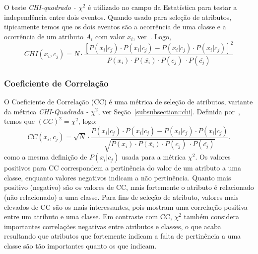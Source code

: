 O teste \textit{CHI-quadrado - $\chi^2$} é utilizado no campo da Estatística para testar a independência entre dois eventos. Quando usado para seleção de atributos, tipicamente temos que os dois eventos são a ocorrência de uma classe e a ocorrência de um atributo $A_i$ com valor $x_i$, ver~\cite{Zheng03}. Logo,
\begin{equation}\label{eqn::chi}
   CHI(x_i, c_j) = N \cdot \frac{ [ P(x_i|c_j) \cdot P(\overline{x_i}|\overline{c_j}) - P(x_i|\overline{c_j}) \cdot P(\overline{x_i}|c_j) ]^2 } {P(x_i) \cdot P(\overline{x_i}) \cdot P(c_j) \ \cdot P(\overline{c_j}) }
\end{equation}

\subsubsection{Coeficiente de Correlação}
\label{subsubsection::cc}

O Coeficiente de Correlação (CC) é uma métrica de seleção de atributos, variante da métrica \textit{CHI-Quadrada - $\chi^2$}, ver Seção~\ref{subsubsection::chi}. Definida por~\cite{Ng97}, temos que $(CC)^2 = \chi^2$, logo:
\begin{equation}\label{eqn::ce}
   CC(x_i, c_j) = \sqrt{N} \cdot \frac{ P(x_i|c_j) \cdot P(\overline{x_i}|\overline{c_j}) - P(x_i|\overline{c_j}) \cdot P(\overline{x_i}|c_j) } {\sqrt{ P(x_i) \cdot P(\overline{x_i}) \cdot P(c_j) \ \cdot P(\overline{c_j}) } }.
\end{equation}
como a mesma definição de $P(x_i|c_j)$ usada para a métrica $\chi^2$. Os valores positivos para CC correspondem a pertinência do valor de um atributo a uma classe, enquanto valores negativos indicam a não pertinência. Quanto mais positivo (negativo) são os valores de CC, mais fortemente o atributo é relacionado (não relacionado) a uma classe. Para fins de seleção de atributo, valores mais elevados de CC são os mais interessantes, pois mostram uma correlação positiva entre um atributo e uma classe. Em contraste com CC, $\chi^2$ também considera importantes correlações negativas entre atributos e classes, o que acaba resultando que atributos que fortemente indicam a falta de pertinência a uma classe são tão importantes quanto os que indicam.

